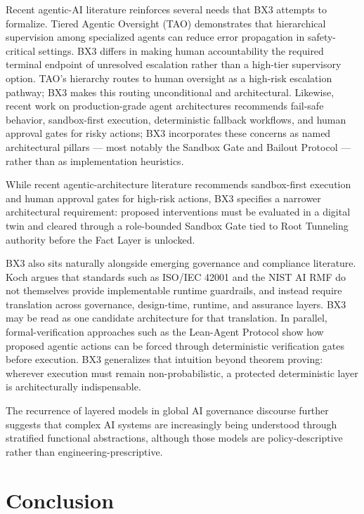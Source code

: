 \documentclass[12pt]{article}
\begin{document}
Recent agentic-AI literature reinforces several needs that BX3 attempts to formalize. Tiered Agentic Oversight (TAO) \cite{kim2025} demonstrates that hierarchical supervision among specialized agents can reduce error propagation in safety-critical settings. BX3 differs in making human accountability the required terminal endpoint of unresolved escalation rather than a high-tier supervisory option. TAO's hierarchy routes to human oversight as a high-risk escalation pathway; BX3 makes this routing unconditional and architectural. Likewise, recent work on production-grade agent architectures \cite{alenezi2026} recommends fail-safe behavior, sandbox-first execution, deterministic fallback workflows, and human approval gates for risky actions; BX3 incorporates these concerns as named architectural pillars --- most notably the Sandbox Gate and Bailout Protocol --- rather than as implementation heuristics.

While recent agentic-architecture literature recommends sandbox-first execution and human approval gates for high-risk actions, BX3 specifies a narrower architectural requirement: proposed interventions must be evaluated in a digital twin and cleared through a role-bounded Sandbox Gate tied to Root Tunneling authority before the Fact Layer is unlocked.

BX3 also sits naturally alongside emerging governance and compliance literature. Koch \cite{koch2026} argues that standards such as ISO/IEC 42001 \cite{iso2023} and the NIST AI RMF \cite{nist2023} do not themselves provide implementable runtime guardrails, and instead require translation across governance, design-time, runtime, and assurance layers. BX3 may be read as one candidate architecture for that translation. In parallel, formal-verification approaches such as the Lean-Agent Protocol \cite{rashie2026} show how proposed agentic actions can be forced through deterministic verification gates before execution. BX3 generalizes that intuition beyond theorem proving: wherever execution must remain non-probabilistic, a protected deterministic layer is architecturally indispensable.

The recurrence of layered models in global AI governance discourse \cite{sabah2026} further suggests that complex AI systems are increasingly being understood through stratified functional abstractions, although those models are policy-descriptive rather than engineering-prescriptive.

\section{Conclusion}
\label{sec:conclusion}
\end{document}
